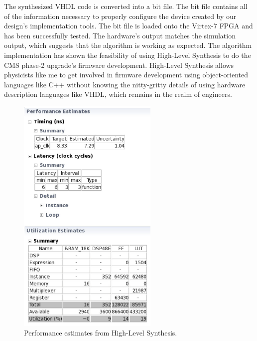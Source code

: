 The synthesized VHDL code is converted into a bit file. The bit file contains all of the information necessary to properly configure the device created by our design's implementation tools. The bit file is loaded onto the Virtex-7 FPGA and has been successfully tested. The hardware's output matches the simulation output, which suggests that the algorithm is working as expected. The algorithm implementation has shown the feasibility of using High-Level Synthesis to do the CMS phase-2 upgrade's firmware development. High-Level Synthesis allows physicists like me to get involved in firmware development using object-oriented languages like C++ without knowing the nitty-gritty details of using hardware description languages like VHDL, which remains in the realm of engineers.

\begin{figure}[htbp]
  \centering
  \includegraphics[width=0.6\textwidth]{plots/chapter3/HLS.png}
  \caption{Performance estimates from High-Level Synthesis.}
  \label{fig:HLS}
\end{figure}
